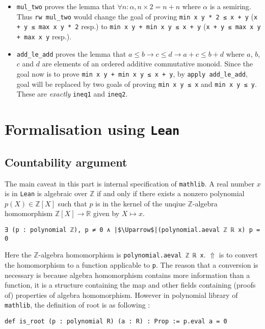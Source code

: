 \documentclass{report}
\theoremstyle{definition}
\theoremstyle{plain}
\begin{document}
\begin{itemize}
  \item {\tt mul\_two} proves the lemma that $\forall n:\alpha, n\times 2 = n+n$ where $\alpha$ is a semiring. Thus {\tt rw mul\_two} would change the goal of proving {\tt min x y * 2 ≤ x + y} ({\tt x + y ≤ max x y * 2} resp.) to {\tt min x y + min x y ≤ x + y} ({\tt x + y ≤ max x y + max x y} resp.).
  \item {\tt add\_le\_add} proves the lemma that $a \le b \to c \le d \to a + c \le b + d$ where $a$, $b$, $c$ and $d$ are elements of an ordered additive commutative monoid. Since the goal now is to prove {\tt min x y + min x y ≤ x + y}, by {\tt apply add\_le\_add}, goal will be replaced by two goals of proving {\tt min x y ≤ x} and {\tt min x y ≤ y}. These are {\it exactly} {\tt ineq1} and {\tt ineq2}.
\end{itemize}

\chapter{Formalisation using {\tt Lean}}\label{fmlsn}

\section{Countability argument}\label{fmlsn:count}
The main caveat in this part is internal specification of {\tt mathlib}. 
A real number $x$ is in {\tt Lean} is algebraic over $\mathbb Z$ if and only if there exists a nonzero polynomial $p(X)\in\mathbb Z[X]$ such that $p$ is in the kernel of the unqiue $\mathbb Z$-algebra homomorphism $\mathbb Z[X]\to\mathbb R$ given by $X\mapsto x$.
\begin{verbatim}
∃ (p : polynomial ℤ), p ≠ 0 ∧ |$\Uparrow$|(polynomial.aeval ℤ ℝ x) p = 0
\end{verbatim}
Here the $\mathbb Z$-algebra homomorphism is {\tt polynomial.aeval ℤ ℝ x}. $\Uparrow$ is to convert the homomorphism to a function applicable to {\tt p}. The reason that a conversion is necessary is because algebra homomorphism contains more information than a function, it is a structure containing the map and other fields containing (proofs of) properties of algebra homomorphism.
However in polynomial library of {\tt mathlib}, the definition of root is as following :

\begin{verbatim}
def is_root (p : polynomial R) (a : R) : Prop := p.eval a = 0
\end{verbatim}
\end{document}
